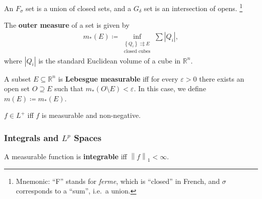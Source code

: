 \begin{definition}

An \(F_\sigma\) set is a union of closed sets, and a \(G_\delta\) set is
an intersection of opens. \footnote{Mnemonic: ``F'' stands for
  \emph{ferme}, which is ``closed'' in French, and \(\sigma\)
  corresponds to a ``sum'', i.e.~a union.}

\end{definition}

\begin{definition}

The \textbf{outer measure} of a set is given by
\begin{align*}
m_*(E) \coloneqq\inf_{\substack{\left\{{Q_{i}}\right\} \rightrightarrows E \\ \text{closed cubes}}} \sum {\left\lvert {Q_{i}} \right\rvert}
,\end{align*}
where \({\left\lvert {Q_i} \right\rvert}\) is the standard Euclidean
volume of a cube in \({\mathbb{R}}^n\).

\end{definition}

\begin{definition}

A subset \(E\subseteq {\mathbb{R}}^n\) is \textbf{Lebesgue measurable}
iff for every \({\varepsilon}> 0\) there exists an open set
\(O \supseteq E\) such that \(m_*(O\setminus E) < {\varepsilon}\). In
this case, we define \(m(E) \coloneqq m_*(E)\).

\end{definition}

\begin{definition}

\(f\in L^+\) iff \(f\) is measurable and non-negative.

\end{definition}

\hypertarget{integrals-and-lp-spaces}{%
\subsubsection{\texorpdfstring{Integrals and \(L^p\)
Spaces}{Integrals and L\^{}p Spaces}}\label{integrals-and-lp-spaces}}

\begin{definition}[Integrability]

A measurable function is \textbf{integrable} iff
\({\left\lVert {f} \right\rVert}_1 < \infty\).

\end{definition}

